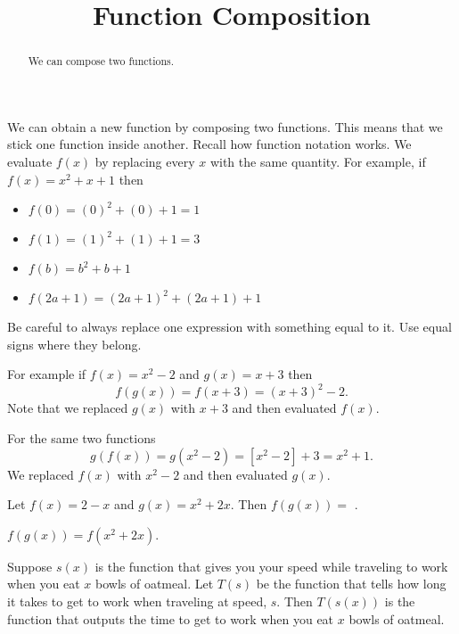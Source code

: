 \documentclass{ximera}
\title{Function Composition}
\begin{document}
\begin{abstract}
We can compose two functions.
\end{abstract}
\maketitle


We can obtain a new function by composing two functions. This means that we stick one function inside another. Recall how function notation works. We evaluate $f(x)$ by replacing every $x$ with the same quantity. For example, if $f(x)=x^2+x+1$ then 
\begin{itemize}
\item $f(0)=(0)^2+(0)+1=1$
\item $f(1)=(1)^2+(1)+1=3$
\item $f(b)=b^2+b+1$
\item $f(2a+1)=(2a+1)^2+(2a+1)+1$
\end{itemize}

Be careful to always replace one expression with something equal to it. Use equal signs where they belong.

For example if $f(x)=x^2-2$ and $g(x)=x+3$ then 
\[
f(g(x))=f(x+3)=(x+3)^2-2.
\]
Note that we replaced $g(x)$ with $x+3$ and then evaluated $f(x)$.

For the same two functions
\[
g(f(x))=g(x^2-2)=[x^2-2]+3=x^2+1.
\]
We replaced $f(x)$ with $x^2-2$ and then evaluated $g(x)$.

\begin{question}
Let $f(x)=2-x$ and $g(x)=x^2+2x$. Then
$f(g(x))=$ .
\begin{solution}
\begin{hint}
$f(g(x))=f(x^2+2x)$.
\end{hint}
\end{solution}
\end{question}


Suppose $s(x)$ is the function that gives you your speed while traveling to work when you eat $x$ bowls of oatmeal. Let $T(s)$ be the function that tells how long it takes to get to work when traveling at speed, $s$. Then $T(s(x))$ is the function that outputs the time to get to work when you eat $x$ bowls of oatmeal.
\end{document}
